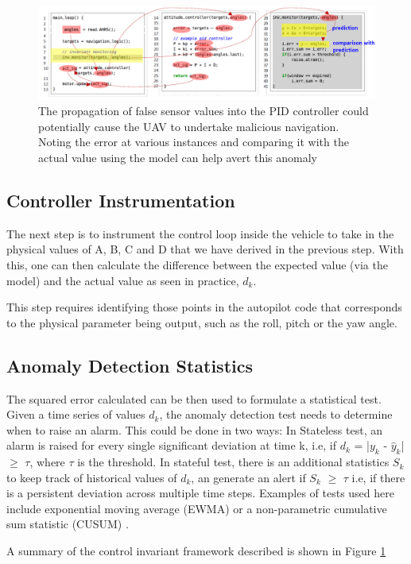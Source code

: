 \begin{figure}[h!]
    \centering
    \includegraphics[width=\textwidth]{images/controller-invariant-framework.png}
    \caption{The propagation of false sensor values into the PID controller could potentially cause the UAV to undertake malicious navigation. Noting the error at various instances and comparing it with the actual value using the model can help avert this anomaly \cite{choi2018detecting}}
    \label{fig:controller-invariant-framework}
\end{figure}

\subsection{Controller Instrumentation} The next step is to instrument the control loop inside the vehicle to take in the physical values of A, B, C and D that we have derived in the previous step. With this, one can then calculate the difference between the expected value (via the model) and the actual value as seen in practice, $d_k$. 

This step requires identifying those points in the autopilot code that corresponds to the physical parameter being output, such as the roll, pitch or the yaw angle. 


\subsection{Anomaly Detection Statistics} 
The squared error calculated can be then used to formulate a statistical test. Given a time series of values $d_k$, the anomaly detection test needs to determine when to raise an alarm. This could be done in two ways: In Stateless test, an alarm is raised for every single significant deviation at time k, i.e, if $d_k$ = |$y_k$ - $\hat{y}_k$| $\geq$ $\tau$, where $\tau$ is the threshold. In stateful test, there is an additional statistics $S_k$ to keep track of historical values of $d_k$, an generate an alert if $S_k$ $\geq$ $\tau$ i.e, if there is a persistent deviation across multiple time steps. Examples of tests used here include exponential moving average (EWMA) or a non-parametric cumulative sum statistic (CUSUM) \cite{healy1987note}.

A summary of the control invariant framework described is shown in Figure \ref{fig:controller-invariant-framework}


